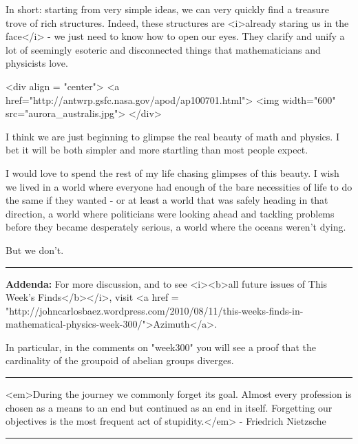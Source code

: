 In short: starting from very simple ideas, we can very quickly find a
treasure trove of rich structures.  Indeed, these structures are
<i>already staring us in the face</i> - we just need to know how to
open our eyes.  They clarify and unify a lot of seemingly esoteric and
disconnected things that mathematicians and physicists love.

<div align = "center">
<a href="http://antwrp.gsfc.nasa.gov/apod/ap100701.html">
<img width="600" src="aurora_australis.jpg">
</div>


I think we are just beginning to glimpse the real beauty of math and
physics. I bet it will be both simpler and more startling than most
people expect.

I would love to spend the rest of my life chasing glimpses of this
beauty.  I wish we lived in a world where everyone had enough of the
bare necessities of life to do the same if they wanted - or at least a
world that was safely heading in that direction, a world where
politicians were looking ahead and tackling problems before they
became desperately serious, a world where the oceans weren't dying.

But we don't. 
\par\noindent\rule{\textwidth}{0.4pt}
\textbf{Addenda:}
For more discussion, and to see <i><b>all future issues of This 
Week's Finds</b></i>, visit <a href = "http://johncarlosbaez.wordpress.com/2010/08/11/this-weeks-finds-in-mathematical-physics-week-300/">Azimuth</a>.

In particular, in the comments on "week300" you will see
a proof that the cardinality of the groupoid of abelian groups diverges.

\par\noindent\rule{\textwidth}{0.4pt}
<em>During the journey we commonly forget its goal. Almost every profession 
is chosen as a means to an end but continued as an end in itself. 
Forgetting our objectives is the most frequent act of stupidity.</em> - 
Friedrich Nietzsche

\par\noindent\rule{\textwidth}{0.4pt}

